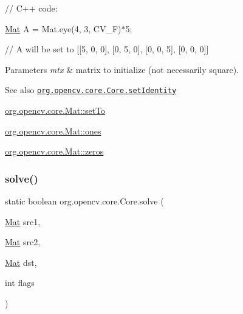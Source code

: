 // C++ code\+:

\mbox{\hyperlink{classorg_1_1opencv_1_1core_1_1_mat}{Mat}} A = Mat.\+eye(4, 3, C\+V\+\_\+F)$\ast$5;

// A will be set to \mbox{[}\mbox{[}5, 0, 0\mbox{]}, \mbox{[}0, 5, 0\mbox{]}, \mbox{[}0, 0, 5\mbox{]}, \mbox{[}0, 0, 0\mbox{]}\mbox{]}


\begin{DoxyParams}{Parameters}
{\em mtx} & matrix to initialize (not necessarily square).\\
\hline
\end{DoxyParams}
\begin{DoxySeeAlso}{See also}
\href{http://docs.opencv.org/modules/core/doc/operations_on_arrays.html#setidentity}{\tt org.\+opencv.\+core.\+Core.\+set\+Identity} 

\mbox{\hyperlink{classorg_1_1opencv_1_1core_1_1_mat_a9316a305061d8ef51b7e7355d5e7440d}{org.\+opencv.\+core.\+Mat\+::set\+To}} 

\mbox{\hyperlink{classorg_1_1opencv_1_1core_1_1_mat_a34d703df023730d043298601b6962f57}{org.\+opencv.\+core.\+Mat\+::ones}} 

\mbox{\hyperlink{classorg_1_1opencv_1_1core_1_1_mat_aff41070138369b96f792b19f01ab00d9}{org.\+opencv.\+core.\+Mat\+::zeros}} 
\end{DoxySeeAlso}
\mbox{\label{classorg_1_1opencv_1_1core_1_1_core_af6e1ab8eaa1618c30a16e38da739bbeb}} 
\subsubsection{\texorpdfstring{solve()}{solve()}\hspace{0.1cm}{\footnotesize\ttfamily [1/2]}}
{\footnotesize\ttfamily static boolean org.\+opencv.\+core.\+Core.\+solve (\begin{DoxyParamCaption}\item[{\mbox{\hyperlink{classorg_1_1opencv_1_1core_1_1_mat}{Mat}}}]{src1,  }\item[{\mbox{\hyperlink{classorg_1_1opencv_1_1core_1_1_mat}{Mat}}}]{src2,  }\item[{\mbox{\hyperlink{classorg_1_1opencv_1_1core_1_1_mat}{Mat}}}]{dst,  }\item[{int}]{flags }\end{DoxyParamCaption})\hspace{0.3cm}{\ttfamily [static]}}

